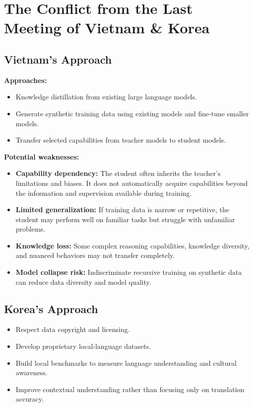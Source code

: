 \documentclass[a4paper,12pt]{report}
\begin{document}
\section{The Conflict from the Last Meeting of Vietnam \& Korea}

\subsection{Vietnam's Approach}

\textbf{Approaches:}

\begin{itemize}
    \item Knowledge distillation from existing large language models.
    \item Generate synthetic training data using existing models and fine-tune smaller models.
    \item Transfer selected capabilities from teacher models to student models.
\end{itemize}

\textbf{Potential weaknesses:}

\begin{itemize}
    \item \textbf{Capability dependency:} The student often inherits the teacher's limitations and biases. It does not automatically acquire capabilities beyond the information and supervision available during training.
    
    \item \textbf{Limited generalization:} If training data is narrow or repetitive, the student may perform well on familiar tasks but struggle with unfamiliar problems.
    
    \item \textbf{Knowledge loss:} Some complex reasoning capabilities, knowledge diversity, and nuanced behaviors may not transfer completely.
    
    \item \textbf{Model collapse risk:} Indiscriminate recursive training on synthetic data can reduce data diversity and model quality.
\end{itemize}

\subsection{Korea's Approach}

\begin{itemize}
    \item Respect data copyright and licensing.
    \item Develop proprietary local-language datasets.
    \item Build local benchmarks to measure language understanding and cultural awareness.
    \item Improve contextual understanding rather than focusing only on translation accuracy.
\end{itemize}
\end{document}
